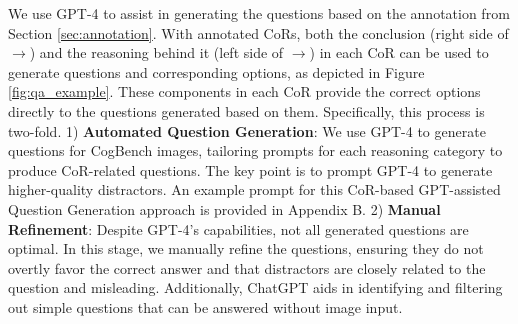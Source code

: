 
We use GPT-4 \cite{openai2023gpt4} to assist in generating the questions based on the annotation from Section \ref{sec:annotation}. %
With annotated CoRs, both the conclusion (right side of$\rightarrow$) and the reasoning behind it (left side of $\rightarrow$) in each CoR can be used to generate questions and corresponding options, as depicted in Figure \ref{fig:qa_example}.
These components in each CoR provide the correct options directly to the questions generated based on them. 
Specifically, this process is two-fold. 
1) \textbf{Automated Question Generation}: We use GPT-4 to generate questions for CogBench images, tailoring prompts for each reasoning category to produce CoR-related questions. The key point is to prompt GPT-4 to generate higher-quality distractors. An example prompt for this CoR-based GPT-assisted Question Generation approach is provided in Appendix B. %
2) \textbf{Manual Refinement}: Despite GPT-4's capabilities, not all generated questions are optimal. In this stage, we manually refine the questions, ensuring they do not overtly favor the correct answer and that distractors are closely related to the question and misleading. 
Additionally, ChatGPT aids in identifying and filtering out simple questions that can be answered without image input.







